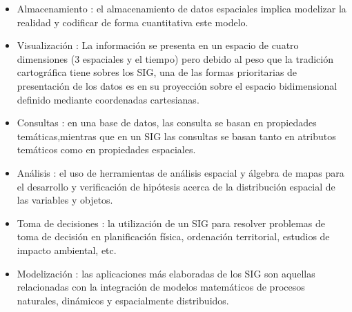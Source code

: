 \begin{itemize}
    \item  Almacenamiento : el almacenamiento de datos espaciales implica modelizar la realidad y codificar de
    forma cuantitativa este modelo.

    \item Visualización : La información se presenta en un espacio de cuatro dimensiones (3 espaciales y el tiempo) 
    pero debido al peso que la tradición cartográfica tiene sobres los SIG, una de las formas prioritarias de 
    presentación de los datos es en su proyección sobre el espacio bidimensional definido mediante coordenadas cartesianas.
    
    \item Consultas  : en una base de datos, las consulta se basan en propiedades temáticas,mientras que en un SIG 
    las consultas se basan tanto en atributos temáticos como en propiedades espaciales.

    \item Análisis :  el uso de herramientas de análisis espacial y álgebra de mapas para el desarrollo y
    verificación de hipótesis acerca de la distribución espacial de las variables y objetos.

    \item Toma de decisiones : la utilización de un SIG para resolver problemas de toma de decisión en
    planificación física, ordenación territorial, estudios de impacto ambiental, etc.

    \item Modelización : las aplicaciones más elaboradas de los SIG son aquellas relacionadas con la integración 
    de modelos matemáticos de procesos naturales, dinámicos y espacialmente distribuidos.
\end{itemize}
